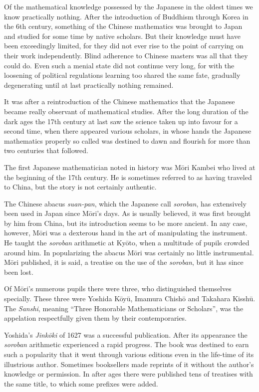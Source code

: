 \documentclass[11pt]{article}
\newcommand{\scanpage}[2]{\clearpage\setcounter{footnote}{0}\noindent{\footnotesize\color{gray}PDF page #1 · #2}\par\medskip}
\newcommand{\scanfooter}{}
\begin{document}
Of the mathematical knowledge possessed by the Japanese in the oldest times we know practically nothing. After the introduction of Buddhism through Korea in the 6th century, something of the Chinese mathematics was brought to Japan and studied for some time by native scholars. But their knowledge must have been exceedingly limited, for they did not ever rise to the point of carrying on their work independently. Blind adherence to Chinese masters was all that they could do. Even such a menial state did not continue very long, for with the loosening of political regulations learning too shared the same fate, gradually degenerating until at last practically nothing remained.

It was after a reintroduction of the Chinese mathematics that the Japanese became really observant of mathematical studies. After the long duration of the dark ages the 17th century at last saw the science taken up into favour for a second time, when there appeared various scholars, in whose hands the Japanese mathematics properly so called was destined to dawn and flourish for more than two centuries that followed.

The first Japanese mathematician noted in history was Mōri Kambei who lived at the beginning of the 17th century. He is sometimes referred to as having traveled to China, but the story is not certainly authentic.

The Chinese abacus \emph{suan-pan}, which the Japanese call \emph{soroban}, has extensively been used in Japan since Mōri's days. As is usually believed, it was first brought by him from China, but its introduction seems to be more ancient. In any case, however, Mōri was a dexterous hand in the art of manipulating the instrument. He taught the \emph{soroban} arithmetic at Kyōto, when a multitude of pupils crowded around him. In popularizing the abacus Mōri was certainly no little instrumental. Mōri published, it is said, a treatise on the use of the \emph{soroban}, but it has since been lost.
\scanfooter

\scanpage{0171}{Chapter 22, printed page 157}
Of Mōri's numerous pupils there were three, who distinguished themselves specially. These three were Yoshida Kōyū, Imamura Chishō and Takahara Kisshū. The \emph{Sanshi}, meaning ``Three Honorable Mathematicians or Scholars'', was the appelation respectfully given them by their contemporaries.

Yoshida's \emph{Jinkōki} of 1627 was a successful publication. After its appearance the \emph{soroban} arithmetic experienced a rapid progress. The book was destined to earn such a popularity that it went through various editions even in the life-time of its illustrious author. Sometimes booksellers made reprints of it without the author's knowledge or permission. In after ages there were published tens of treatises with the same title, to which some prefixes were added.
\end{document}
